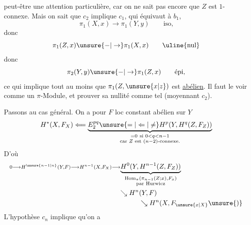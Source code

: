 peut-être une attention particulière, car on
ne sait pas \unsure{$=$} encore que $Z$ est $1$-connexe.
Mais  on sait que $c_2$ implique $c_1$, qui équivaut
à $b_1$, 
\[
 \pi_1(X,x)\longrightarrow\pi_1(Y,y)\qquad\text{iso,}
\]
donc
\[
 \pi_1(Z,x)\unsure{-|\to}\pi_1(X,x)\qquad\text{\uline{nul}}
\]
donc
\[
 \pi_2(Y,y)\unsure{-|\to}\pi_1(Z,x)\qquad\text{épi,}
\]
ce qui implique tout au moins que
$\pi_1(Z,\unsure{x|z})$ est \uline{abélien}.  Il faut le
voir comme un $\pi$-Module, et prouver
sa nullité comme tel (moyennant $c_2$).

Passons au cas général. On a pour $F$ loc
constant abélien sur $Y$
\[
 H^*(X,F_X)\Longleftarrow
 \underbrace{E_2^{pq}\unsure{=|\Leftarrow|\ne}H^p(Y,H^q(Z,F_Z))}
 _{\substack{=0\ \text{si }0<q<n-1\\\text{car }Z\text{ est }(n-2)\text{-connexe}.}}
\]
D'où
\[
 \begin{aligned}
 \scriptstyle 0\longrightarrow H^{\unsure{n-1|n}}(Y,F)\longrightarrow H^{n-1}(X,F_X)
 &\scriptstyle\longrightarrow\underbrace{H^0(Y,H^{n-1}(Z,F_Z))}
 _{\substack{\operatorname{Hom}_\pi(\pi_{n-1}(Z;x),F_x)\\\text{par Hurwicz}}}
 \\
 &\quad\searrow H^n(Y,F)\\
 &\qquad\qquad\searrow H^n(X,F_{\unsure{x|X}}\unsure{)}
 \end{aligned}
\]
L'hypothèse $c_n$ implique qu'on a

